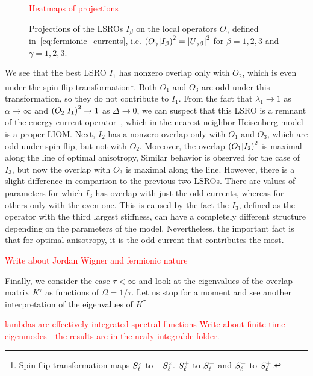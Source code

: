 \begin{figure}[htbp]
  \centering
  \textcolor{red}{Heatmaps of projections}
  \caption{Projections of the LSROs \(I_{\beta}\) on the local operators \(O_{\gamma}\) defined in~\eqref{eq:fermionic_currents},
  i.e. \(\left(O_{\gamma} \middle| I_{\beta}\right)^2 = \abs{U_{\gamma\beta}}^2\) for \(\beta = 1,2,3\) and \(\gamma = 1,2,3\).}
  \label{fig:projections}
\end{figure}

We see that the best LSRO \(I_1\) has nonzero overlap only with \(O_2\), which is even under the
spin-flip transformation\footnote{Spin-flip transformation maps \(S^{z}_{\ell}\) to \(-S^{z}_{\ell}\).
\(S^{+}_{\ell}\) to \(S^{-}_{\ell}\) and \(S^{-}_{\ell}\) to \(S^{+}_{\ell}\).}.
Both \(O_1\) and \(O_3\) are odd under this transformation, so they do not contribute to \(I_1\).
From the fact that \(\lambda_1 \to 1\) as \(\alpha \to \infty\) and \(\left(O_2 \middle| I_1\right)^2 \to 1\) as
\(\Delta\to 0\), we can suspect that this LSRO is a remnant of the energy current operator~\autocite{Zotos1997},
which in the nearest-neighbor Heisenberg model is a proper LIOM.
Next, \(I_2\) has a nonzero overlap only with \(O_1\) and \(O_3\), which are odd under spin flip,
but not with \(O_2\). Moreover, the overlap \(\left(O_1 \middle| I_2\right)^2\) is maximal along the line of optimal anisotropy,
Similar behavior is observed for the case of \(I_3\), but now the overlap with \(O_3\) is maximal along the
line. However, there is a slight difference in comparison to the previous two LSROs. There are
values of parameters for which \(I_3\) has overlap with just the odd currents, whereas for others
only with the even one. This is caused by the fact the \(I_3\), defined as the operator with
the third largest stiffness, can have a completely different structure depending on the parameters of 
the model. Nevertheless, the important fact is that for optimal anisotropy, it is the odd
current that contributes the most. 


\textcolor{red}{Write about Jordan Wigner and fermionic nature}




Finally, we consider the case \(\tau < \infty\) and look at the eigenvalues
of the overlap matrix \(K^{\tau}\) as functions of \(\Omega = 1/\tau\). Let us stop
for a moment and see another interpretation of the eigenvalues of \(K^{\tau}\)

\textcolor{red}{lambdas are effectively integrated spectral functions}
\textcolor{red}{Write about finite time eigenmodes - the results are in the nealy integrable folder.}